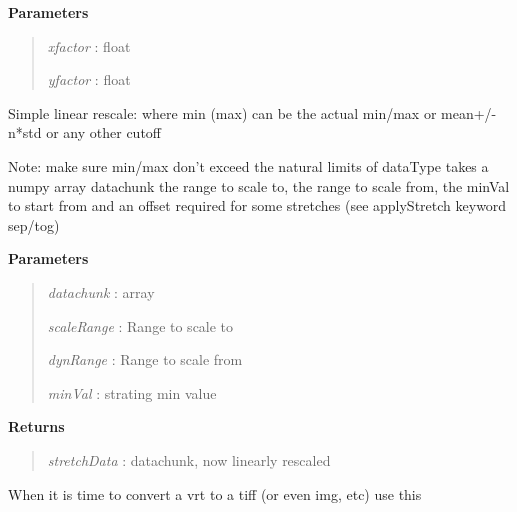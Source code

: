 \documentclass[letterpaper,10pt,openany,oneside]{sphinxmanual}
\begin{document}
\begin{fulllineitems}
\begin{fulllineitems}
\textbf{Parameters}
\begin{quote}

\emph{xfactor} : float

\emph{yfactor} : float
\end{quote}

\end{fulllineitems}


\begin{fulllineitems}
\label{code:Image.Image.stretchLinear}
Simple linear rescale: where min (max) can be the actual min/max or mean+/- n*std or any other cutoff

Note: make sure min/max don't exceed the natural limits of dataType
takes a numpy array datachunk the range to scale to, the range to scale
from, the minVal to start from and an offset required for some stretches
(see applyStretch keyword sep/tog)

\textbf{Parameters}
\begin{quote}

\emph{datachunk}   : array

\emph{scaleRange}  : Range to scale to

\emph{dynRange}    : Range to scale from

\emph{minVal}      : strating min value
\end{quote}

\textbf{Returns}
\begin{quote}

\emph{stretchData} : datachunk, now linearly rescaled
\end{quote}

\end{fulllineitems}


\begin{fulllineitems}
\label{code:Image.Image.vrt2RealImg}
When it is time to convert a vrt to a tiff (or even img, etc) use this

\end{fulllineitems}


\end{fulllineitems}
\end{document}
